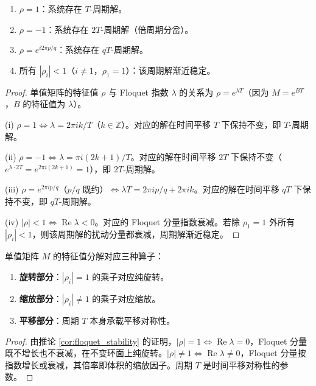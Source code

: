 \begin{corollary}\label{cor:floquet_stability}
\begin{enumerate}[label=(\roman*)]
    \item $\rho = 1$：系统存在 $T$-周期解。
    \item $\rho = -1$：系统存在 $2T$-周期解（倍周期分岔）。
    \item $\rho = e^{i 2\pi p/q}$：系统存在 $qT$-周期解。
    \item 所有 $|\rho_i| < 1$（$i \neq 1$，$\rho_1 = 1$）：该周期解渐近稳定。
\end{enumerate}
\end{corollary}

\begin{proof}
单值矩阵的特征值 $\rho$ 与 Floquet 指数 $\lambda$ 的关系为 $\rho = e^{\lambda T}$（因为 $M = e^{BT}$，$B$ 的特征值为 $\lambda$）。

(i) $\rho = 1 \iff \lambda = 2\pi i k/T$（$k \in \mathbb{Z}$）。对应的解在时间平移 $T$ 下保持不变，即 $T$-周期解。

(ii) $\rho = -1 \iff \lambda = \pi i(2k+1)/T$。对应的解在时间平移 $2T$ 下保持不变（$e^{\lambda \cdot 2T} = e^{2\pi i(2k+1)} = 1$），即 $2T$-周期解。

(iii) $\rho = e^{2\pi i p/q}$（$p/q$ 既约）$\iff \lambda T = 2\pi i p/q + 2\pi i k$。对应的解在时间平移 $qT$ 下保持不变，即 $qT$-周期解。

(iv) $|\rho| < 1 \iff \operatorname{Re}\lambda < 0$。对应的 Floquet 分量指数衰减。若除 $\rho_1 = 1$ 外所有 $|\rho_i| < 1$，则该周期解的扰动分量都衰减，周期解渐近稳定。
\end{proof}

\begin{proposition}\label{prop:floquet_operator}
单值矩阵 $M$ 的特征值分解对应三种算子：
\begin{enumerate}[label=(\roman*)]
    \item \textbf{旋转部分}：$|\rho_i| = 1$ 的乘子对应纯旋转。
    \item \textbf{缩放部分}：$|\rho_i| \neq 1$ 的乘子对应缩放。
    \item \textbf{平移部分}：周期 $T$ 本身承载平移对称性。
\end{enumerate}
\end{proposition}

\begin{proof}
由推论 \ref{cor:floquet_stability} 的证明，$|\rho| = 1 \iff \operatorname{Re}\lambda = 0$，Floquet 分量既不增长也不衰减，在不变环面上纯旋转。$|\rho| \neq 1 \iff \operatorname{Re}\lambda \neq 0$，Floquet 分量按指数增长或衰减，其倍率即体积的缩放因子。周期 $T$ 是时间平移对称性的参数。
\end{proof}

